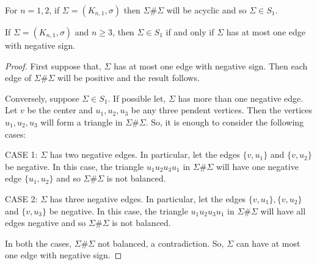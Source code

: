 \remark For $n=1,2$, if $\Sigma=(K_{n,1},\sigma)$ then $\Sigma\# \Sigma$ will be acyclic and so $\Sigma\in S_1$.
\begin{proposition}
  If $\Sigma=(K_{n,1},\sigma)$ and $n\geq 3$, then $\Sigma\in S_1$ if and only if $\Sigma$ has at most one edge with negative sign.
  \end{proposition}
  \begin{proof}
   First suppose that, $\Sigma$ has at most one edge with negative sign. Then each edge of $\Sigma\# \Sigma$ will be positive 
   and the result follows.
   
   Conversely, suppose $\Sigma\in S_1$. If possible let, $\Sigma$ has more than 
one negative edge.
   Let $v$ be the center and $u_1,u_2,u_3$ be any three pendent vertices.
   Then the vertices $u_1,u_2,u_3$ will form a triangle in $\Sigma\# \Sigma$.
   So, it is enough to consider the following cases:
   
   CASE 1: $\Sigma$ has two negative edges. In particular, let the edges $\{v,u_1\}$ and $\{v,u_2\}$ be negative. 
   In this case, the triangle $u_1u_2u_3u_1$ in $\Sigma\# \Sigma$ will have one negative edge $\{u_1,u_2\}$ and so  
$\Sigma\# \Sigma$ is not balanced.
   
   CASE 2: $\Sigma$ has three negative edges. In particular, let the edges 
$\{v,u_1\}, \{v,u_2\}$ and $\{v,u_3\}$ be negative.  In this case, the triangle 
$u_1u_2u_3u_1$ in $\Sigma\# \Sigma$ will have all edges negative 
 and so  $\Sigma\# \Sigma$ is not balanced.

In both the cases, $\Sigma\# \Sigma$ not balanced, a contradiction. So, 
$\Sigma$ can have at most one edge with negative sign.   
  \end{proof}



